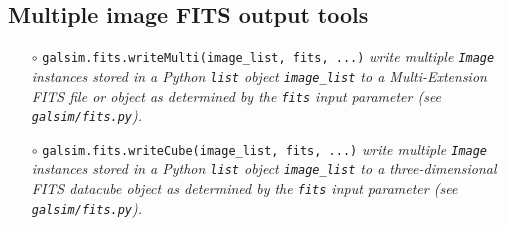 \documentclass[preprint,11pt]{aastex}
\begin{document}
\subsection{Multiple image FITS output tools}\label{sect:multifits}

\begin{itemize}

\item[$\circ$] \texttt{galsim.fits.writeMulti(image\_list, fits, ...)}
  \newline 
\emph{write multiple \texttt{Image} instances stored in a
  Python \texttt{list} object \texttt{image\_list} to a Multi-Extension FITS
  file or object as determined by the \texttt{fits} input parameter (see
  \texttt{galsim/fits.py}).}

\item[$\circ$] \texttt{galsim.fits.writeCube(image\_list, fits, ...)}
  \newline 
\emph{write multiple \texttt{Image} instances stored in a
  Python \texttt{list} object \texttt{image\_list} to a three-dimensional FITS
  datacube object as determined by the \texttt{fits} input parameter (see
  \texttt{galsim/fits.py}).}

\end{itemize}
\end{document}
